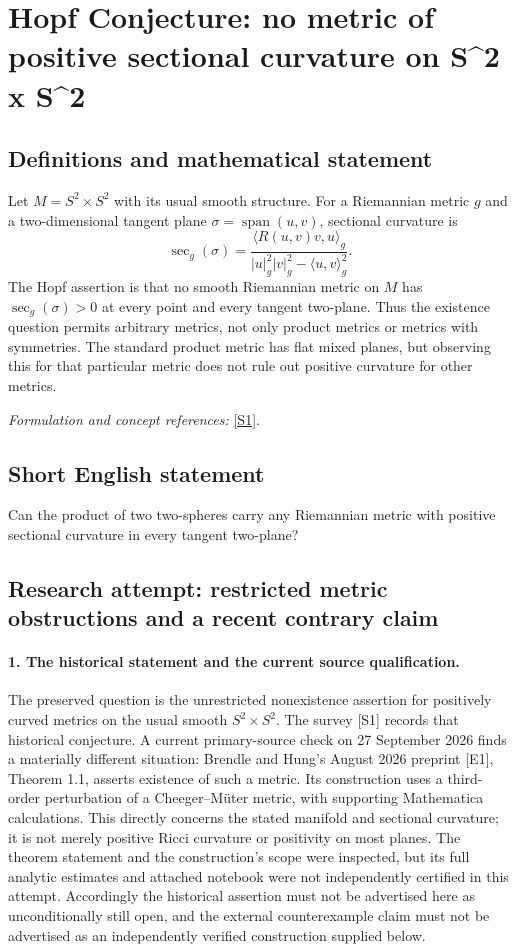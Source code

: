 \documentclass[11pt]{article}
\begin{document}
\section*{\texorpdfstring{Hopf Conjecture: no metric of positive sectional curvature on S\textasciicircum{}2 x S\textasciicircum{}2}{Hopf Conjecture: no metric of positive sectional curvature on S\textasciicircum{}2 x S\textasciicircum{}2}}\label{347}
\subsection{Definitions and mathematical statement}
Let $M=S^2\times S^2$ with its usual smooth structure. For a Riemannian metric $g$ and a two-dimensional tangent plane $\sigma=\operatorname{span}(u,v)$, sectional curvature is
\[
 \sec_g(\sigma)=\frac{\langle R(u,v)v,u\rangle_g}
 {|u|_g^2|v|_g^2-\langle u,v\rangle_g^2}.
\]
The Hopf assertion is that no smooth Riemannian metric on $M$ has $\sec_g(\sigma)>0$ at every point and every tangent two-plane. Thus the existence question permits arbitrary metrics, not only product metrics or metrics with symmetries. The standard product metric has flat mixed planes, but observing this for that particular metric does not rule out positive curvature for other metrics.
\par\smallskip\textit{Formulation and concept references:} \href{https://arxiv.org/html/math/0701389v3}{[S1]}.

\subsection{Short English statement}
Can the product of two two-spheres carry any Riemannian metric with positive sectional curvature in every tangent two-plane?
\subsection{Research attempt: restricted metric obstructions and a recent contrary claim}
\paragraph{1. The historical statement and the current source qualification.}
The preserved question is the unrestricted nonexistence assertion for positively curved metrics on the usual smooth $S^2\times S^2$. The survey [S1] records that historical conjecture. A current primary-source check on 27 September 2026 finds a materially different situation: Brendle and Hung's August 2026 preprint [E1], Theorem 1.1, asserts existence of such a metric. Its construction uses a third-order perturbation of a Cheeger--M\"uter metric, with supporting Mathematica calculations. This directly concerns the stated manifold and sectional curvature; it is not merely positive Ricci curvature or positivity on most planes. The theorem statement and the construction's scope were inspected, but its full analytic estimates and attached notebook were not independently certified in this attempt. Accordingly the historical assertion must not be advertised here as unconditionally still open, and the external counterexample claim must not be advertised as an independently verified construction supplied below.
\end{document}
